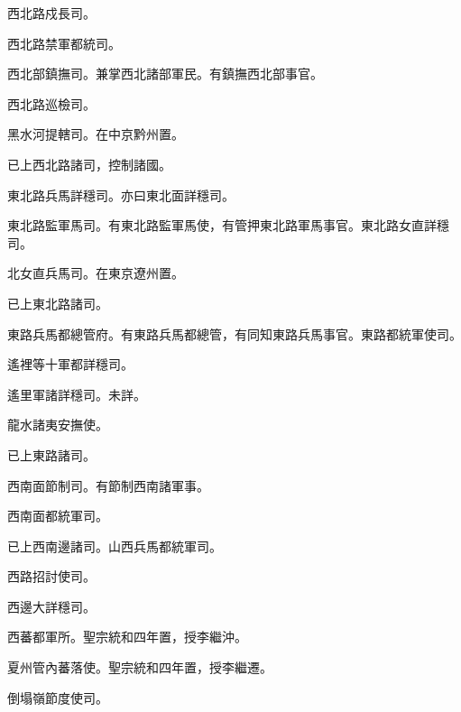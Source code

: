 \begin{pinyinscope}
 西北路戍長司。



 西北路禁軍都統司。



 西北部鎮撫司。兼掌西北諸部軍民。有鎮撫西北部事官。



 西北路巡檢司。



 黑水河提轄司。在中京黔州置。



 已上西北路諸司，控制諸國。



 東北路兵馬詳穩司。亦曰東北面詳穩司。



 東北路監軍馬司。有東北路監軍馬使，有管押東北路軍馬事官。東北路女直詳穩司。



 北女直兵馬司。在東京遼州置。



 已上東北路諸司。



 東路兵馬都總管府。有東路兵馬都總管，有同知東路兵馬事官。東路都統軍使司。



 遙裡等十軍都詳穩司。



 遙里軍諸詳穩司。未詳。



 龍水諸夷安撫使。



 已上東路諸司。



 西南面節制司。有節制西南諸軍事。



 西南面都統軍司。



 已上西南邊諸司。山西兵馬都統軍司。



 西路招討使司。



 西邊大詳穩司。



 西蕃都軍所。聖宗統和四年置，授李繼沖。



 夏州管內蕃落使。聖宗統和四年置，授李繼遷。



 倒塌嶺節度使司。




\end{pinyinscope}

